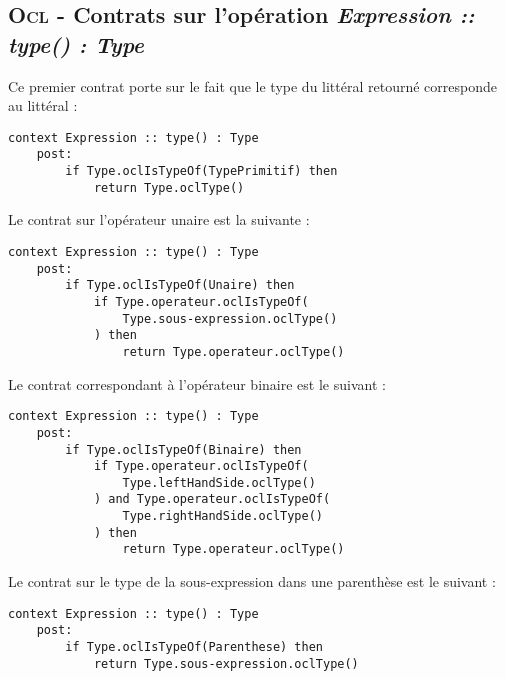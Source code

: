 
\subsection{\textsc{Ocl} - Contrats sur l'opération \emph{Expression :: type() : Type}}
\label{sec:question16}

Ce premier contrat porte sur le fait que le type du littéral retourné corresponde au littéral :

\begin{lstlisting}[caption=Contrat \textsc{Ocl} sur le type des litéraux,captionpos=b,label={lst:type_literal},language=OCL]
context Expression :: type() : Type
	post:
		if Type.oclIsTypeOf(TypePrimitif) then
			return Type.oclType()
\end{lstlisting}

Le contrat sur l'opérateur unaire est la suivante :

\begin{lstlisting}[caption=Contrat \textsc{Ocl} sur le type unaire,captionpos=b,label={lst:type_unaire},language=OCL]
context Expression :: type() : Type
	post:
		if Type.oclIsTypeOf(Unaire) then
			if Type.operateur.oclIsTypeOf(
				Type.sous-expression.oclType()
			) then
				return Type.operateur.oclType()
\end{lstlisting}

Le contrat correspondant à l'opérateur binaire est le suivant :

\begin{lstlisting}[caption=Contrat \textsc{Ocl} sur le type binaire,captionpos=b,label={lst:type_binaire},language=OCL]
context Expression :: type() : Type
	post:
		if Type.oclIsTypeOf(Binaire) then
			if Type.operateur.oclIsTypeOf(
				Type.leftHandSide.oclType()
			) and Type.operateur.oclIsTypeOf(
				Type.rightHandSide.oclType()
			) then
				return Type.operateur.oclType()
\end{lstlisting}

Le contrat sur le type de la sous-expression dans une parenthèse est le suivant :

\begin{lstlisting}[caption=Contrat \textsc{Ocl} sur le type paranthésée,captionpos=b,label={lst:type_paranthese},language=OCL]
context Expression :: type() : Type
	post:
		if Type.oclIsTypeOf(Parenthese) then
			return Type.sous-expression.oclType()
\end{lstlisting}

